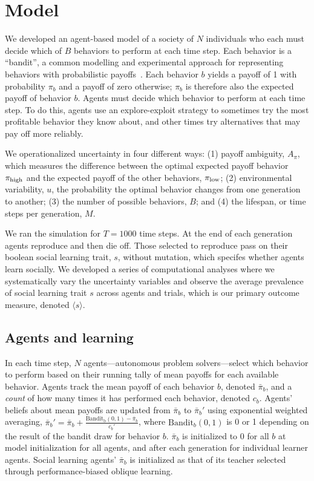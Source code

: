 \documentclass[letterpaper,11.5pt]{scrartcl}
\begin{document}
\section{Model}

We developed an agent-based model of a society of $N$ individuals who each must decide
which of $B$ behaviors to perform at each time step. Each behavior is a ``bandit'',
a common modelling and experimental approach for representing behaviors with
probabilistic payoffs~\cite{SuttonBartoBook, McElreath2005,Rendell2010,Schulz2019}. %
Each behavior $b$ yields a payoff of 1 with probability $\pi_b$ and a payoff of zero
otherwise; $\pi_b$ is therefore also the expected payoff of behavior $b$. Agents must
decide which behavior to perform at each time step. To do this, agents 
use an explore-exploit strategy to sometimes try the most profitable behavior
they know about, and other times try alternatives that may pay off more reliably. 

We operationalized uncertainty in four different ways: 
(1) payoff ambiguity, $A_\pi$, which measures the difference
between the optimal expected payoff behavior $\pi_{\mathrm{high}}$ and the expected payoff
of the other behaviors, $\pi_{\mathrm{low}}$; 
(2) environmental variability, $u$, the probability the optimal behavior changes from one generation to another; 
(3) the number of possible behaviors, $B$; and 
(4) the lifespan, or time steps per generation, $M$. 

We ran the simulation for $T=1000$ time steps. At
the end of each generation agents reproduce and then die off. 
Those selected to reproduce
pass on their boolean social learning trait, $s$, without mutation,
which specifes whether agents learn socially. We developed a series of
computational analyses where we systematically vary the uncertainty
variables and observe the average prevalence of social learning trait $s$
across agents and trials, which is our primary outcome measure, 
denoted $\langle s \rangle$. 

\subsection{Agents and learning}

In each time step, $N$ agents---autonomous problem solvers---select 
which behavior to perform based on their running tally of mean payoffs for 
each available behavior. %
Agents track the mean payoff of each behavior $b$, denoted $\bar\pi_b$, and a \emph{count} of how many times it has performed each behavior, denoted $c_b$. 
Agents' beliefs about mean payoffs are updated from $\bar\pi_b$ to $\bar\pi_b'$ using exponential weighted
averaging, $\bar\pi_b' = \bar\pi_b + \frac{\mathrm{Bandit_b(0, 1)} - \bar\pi_b}{c_b'}$, where
$\mathrm{Bandit}_b(0, 1)$ is 0 or 1 depending on the result of the bandit draw for behavior $b$. 
$\bar\pi_b$ is initialized to 0 for all $b$ at model initialization for
all agents, and after each generation for individual learner agents. Social
learning agents' $\bar\pi_b$ is initialized as that of its teacher selected
through performance-biased oblique learning.
\end{document}
